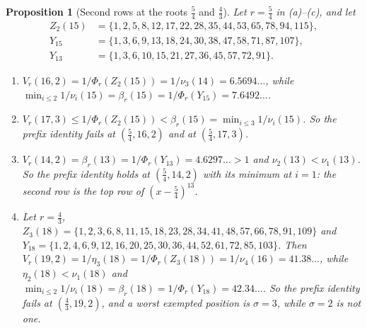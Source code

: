 \documentclass[11pt]{article}
\newtheorem{proposition}[theorem]{Proposition}
\begin{document}
\begin{proposition}[Second rows at the roots $\frac54$ and $\frac43$]\label{prop:secondrowexact}
Let $r=\frac54$ in (a)--(c), and let
\begin{align*}
  Z_2(15)&=\{1,2,5,8,12,17,22,28,35,44,53,65,78,94,115\},\\
  Y_{15}&=\{1,3,6,9,13,18,24,30,38,47,58,71,87,107\},\\
  Y_{13}&=\{1,3,6,10,15,21,27,36,45,57,72,91\}.
\end{align*}
\begin{enumerate}
\item[(a)] $V_r(16,2)=1/\Phi_r(Z_2(15))=1/\nu_3(14)=6.5694\ldots$, while
$\min_{i\le2}1/\nu_i(15)=\beta_r(15)=1/\Phi_r(Y_{15})=7.6492\ldots$.
\item[(b)] $V_r(17,3)\le1/\Phi_r(Z_2(15))<\beta_r(15)=\min_{i\le3}1/\nu_i(15)$.
So the prefix identity fails at $(\frac54,16,2)$ and at $(\frac54,17,3)$.
\item[(c)] $V_r(14,2)=\beta_r(13)=1/\Phi_r(Y_{13})=4.6297\ldots>1$ and
$\nu_2(13)<\nu_1(13)$.  So the prefix identity holds at $(\frac54,14,2)$
with its minimum at $i=1$: the second row is the top row of
$(x-\frac54)^{13}$.
\item[(d)] Let $r=\frac43$,
$Z_3(18)=\{1,2,3,6,8,11,15,18,23,28,34,41,48,57,66,78,91,109\}$ and
$Y_{18}=\{1,2,4,6,9,12,16,20,25,30,36,44,52,61,72,85,103\}$.  Then
$V_r(19,2)=1/\eta_3(18)=1/\Phi_r(Z_3(18))=1/\nu_4(16)=41.38\ldots$, while
$\eta_2(18)<\nu_1(18)$ and
$\min_{i\le2}1/\nu_i(18)=\beta_r(18)=1/\Phi_r(Y_{18})=42.34\ldots$.  So the
prefix identity fails at $(\frac43,19,2)$, and a worst exempted position
is $\sigma=3$, while $\sigma=2$ is not one.
\end{enumerate}
\end{proposition}
\end{document}
